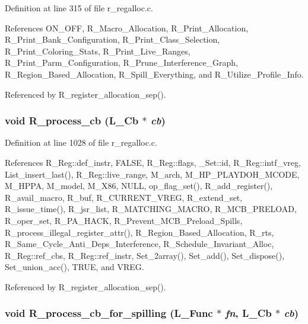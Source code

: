 Definition at line 315 of file r\_\-regalloc.c.

References ON\_\-OFF, R\_\-Macro\_\-Allocation, R\_\-Print\_\-Allocation, R\_\-Print\_\-Bank\_\-Configuration, R\_\-Print\_\-Class\_\-Selection, R\_\-Print\_\-Coloring\_\-Stats, R\_\-Print\_\-Live\_\-Ranges, R\_\-Print\_\-Parm\_\-Configuration, R\_\-Prune\_\-Interference\_\-Graph, R\_\-Region\_\-Based\_\-Allocation, R\_\-Spill\_\-Everything, and R\_\-Utilize\_\-Profile\_\-Info.

Referenced by R\_\-register\_\-allocation\_\-sep().
\subsubsection{\setlength{\rightskip}{0pt plus 5cm}void R\_\-process\_\-cb (L\_\-Cb $\ast$ {\em cb})}\label{r__regproto_8h_a2589ae2b8f1569072cb6b4c1c335511}




Definition at line 1028 of file r\_\-regalloc.c.

References R\_\-Reg::def\_\-instr, FALSE, R\_\-Reg::flags, \_\-Set::id, R\_\-Reg::intf\_\-vreg, List\_\-insert\_\-last(), R\_\-Reg::live\_\-range, M\_\-arch, M\_\-HP\_\-PLAYDOH\_\-MCODE, M\_\-HPPA, M\_\-model, M\_\-X86, NULL, op\_\-flag\_\-set(), R\_\-add\_\-register(), R\_\-avail\_\-macro, R\_\-buf, R\_\-CURRENT\_\-VREG, R\_\-extend\_\-set, R\_\-issue\_\-time(), R\_\-jsr\_\-list, R\_\-MATCHING\_\-MACRO, R\_\-MCB\_\-PRELOAD, R\_\-oper\_\-set, R\_\-PA\_\-HACK, R\_\-Prevent\_\-MCB\_\-Preload\_\-Spills, R\_\-process\_\-illegal\_\-register\_\-attr(), R\_\-Region\_\-Based\_\-Allocation, R\_\-rts, R\_\-Same\_\-Cycle\_\-Anti\_\-Deps\_\-Interference, R\_\-Schedule\_\-Invariant\_\-Alloc, R\_\-Reg::ref\_\-cbs, R\_\-Reg::ref\_\-instr, Set\_\-2array(), Set\_\-add(), Set\_\-dispose(), Set\_\-union\_\-acc(), TRUE, and VREG.

Referenced by R\_\-register\_\-allocation\_\-sep().
\subsubsection{\setlength{\rightskip}{0pt plus 5cm}void R\_\-process\_\-cb\_\-for\_\-spilling (L\_\-Func $\ast$ {\em fn}, L\_\-Cb $\ast$ {\em cb})}\label{r__regproto_8h_2b42fb871244f5a41e35744f4c6efb6f}




